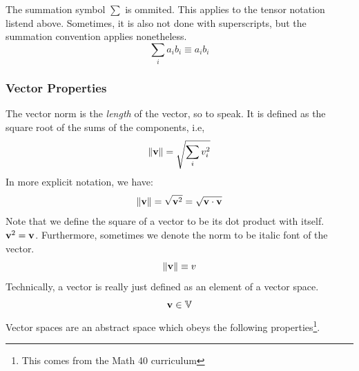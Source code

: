 					The summation symbol $\sum$ is ommited. This applies to the tensor notation listend above.
					Sometimes, it is also not done with superscripts, but the summation convention applies nonetheless.
					\begin{equation}
						\sum_{i} a_i b_i \equiv a_i b_i
					\end{equation}
	\subsubsection{Vector Properties}
			The vector norm is the \textit{length} of the vector, so to speak. It is defined as
			the square root of the sums of the components, i.e,
			\begin{equation}
				\norm{\vb{v}} = \sqrt{\sum_i v_i^2}
			\end{equation}
			In more explicit notation, we have:
			\begin{equation}
				\norm{\vb v} = \sqrt{\vb{v}^2}=\sqrt{\vb v \cdot \vb v}
			\end{equation}
			Note that we define the square of a vector to be its dot product with itself. $\vb v^2 = \vb v $. Furthermore, sometimes we denote 
			the norm to be italic font of the vector. 
			\[
				\norm{\vb{v}} \equiv v
			\]
		Technically, a vector is really just defined as an element of a vector space.
		\[
			\vb{v}\in\mathbb{V}
		\]
		Vector spaces are an abstract space which obeys the following properties\footnote{This comes from the Math 40 curriculum}.
		
